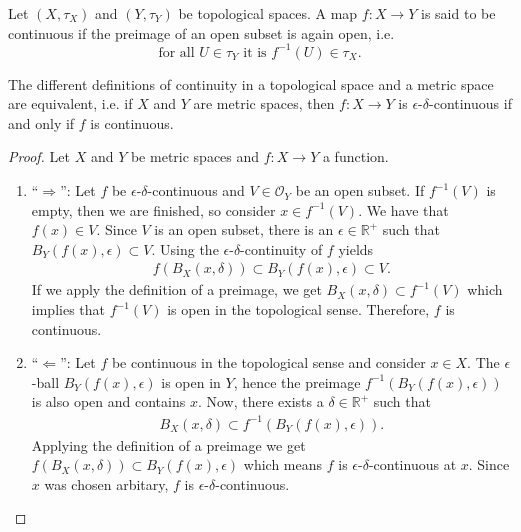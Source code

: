%
\begin{defbox}
    \begin{definition}
        Let \((X, \tau_X)\) and \((Y, \tau_Y)\) be {\color{mathif}topological spaces}. A {\color{mathif}map} \(f: X \longrightarrow Y\) is said to be {\color{maththen}continuous} if the preimage of an open subset is again open, i.e.
        \begin{equation}
            \text{for all } U \in \tau_Y \text{ it is } f^{-1}(U) \in \tau_X \text{.}
        \end{equation}
    \end{definition}
\end{defbox}

\begin{thmbox}
    \begin{proposition}
        The different definitions of continuity in a topological space and a metric space are equivalent, i.e. if \(X\) and \(Y\) are metric spaces, then \(f: X \longrightarrow Y\) is \(\epsilon\)-\(\delta\)-continuous if and only if \(f\) is continuous.
    \end{proposition}
\end{thmbox}
\begin{proof}
    Let \(X\) and \(Y\) be metric spaces and \(f: X \longrightarrow Y\) a function.
    \begin{enumerate}
        \item ``\(\Rightarrow\)'': Let \(f\) be \(\epsilon\)-\(\delta\)-continuous and \(V \in \mathcal{O}_Y\) be an open subset. If \(f^{-1}(V)\) is empty, then we are finished, so consider \(x \in f^{-1}(V)\). We have that \(f(x) \in V\). Since \(V\) is an open subset, there is an \(\epsilon \in \mathbb{R}^+\) such that \(B_Y(f(x), \epsilon) \subset V\). Using the \(\epsilon\)-\(\delta\)-continuity of \(f\) yields
        \begin{align*}
            f(B_X(x, \delta)) \subset B_Y(f(x), \epsilon) \subset V \text{.}
        \end{align*}
        If we apply the definition of a preimage, we get \(B_X(x, \delta) \subset f^{-1}(V)\) which implies that \(f^{-1}(V)\) is open in the topological sense. Therefore, \(f\) is continuous.
        \item ``\(\Leftarrow\)'': Let \(f\) be continuous in the topological sense and consider \(x \in X\). The \(\epsilon\)-ball \(B_Y(f(x), \epsilon)\) is open in \(Y\), hence the preimage \(f^{-1}(B_Y(f(x), \epsilon))\) is also open and contains \(x\). Now, there exists a \(\delta \in \mathbb{R}^+\) such that
        \begin{align*}
            B_X(x, \delta) \subset f^{-1}(B_Y(f(x), \epsilon)) \text{.}
        \end{align*}
        Applying the definition of a preimage we get \(f(B_X(x, \delta)) \subset B_Y(f(x), \epsilon)\) which means \(f\) is \(\epsilon\)-\(\delta\)-continuous at \(x\). Since \(x\) was chosen arbitary, \(f\) is \(\epsilon\)-\(\delta\)-continuous.
    \end{enumerate}
\end{proof}

